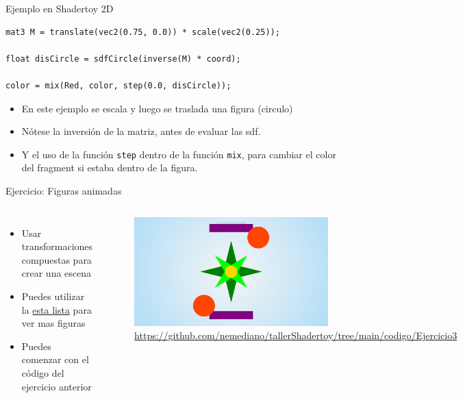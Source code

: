 \begin{frame}[fragile]{Ejemplo en Shadertoy 2D}
\begin{listing}
\begin{verbatim}
mat3 M = translate(vec2(0.75, 0.0)) * scale(vec2(0.25));

float disCircle = sdfCircle(inverse(M) * coord);

color = mix(Red, color, step(0.0, disCircle));
\end{verbatim}
\end{listing}
\begin{itemize}
    \item En este ejemplo se escala y luego se traslada una figura (circulo)
    \item Nótese la inversión de la matriz, antes de evaluar las sdf.
    \item Y el uso de la función \texttt{step} dentro de la función \texttt{mix}, para cambiar el color del fragment si estaba dentro de la figura.
\end{itemize}
\end{frame}

\begin{frame}{Ejercicio: Figuras animadas}
\begin{columns}
     \begin{itemize}
         \item Usar transformaciones compuestas para crear una escena
         \item Puedes utilizar la \href{https://iquilezles.org/articles/distfunctions2d/}{esta lista} para ver mas figuras
         \item Puedes comenzar con el código del ejercicio anterior 
     \end{itemize}
        \begin{figure}[htb]
            \centering
            \includegraphics[width=0.6\textwidth]{img/Ejer3}
            \caption{\url{https://github.com/nemediano/tallerShadertoy/tree/main/codigo/Ejercicio3}}
        \end{figure}
\end{columns}
\end{frame}
